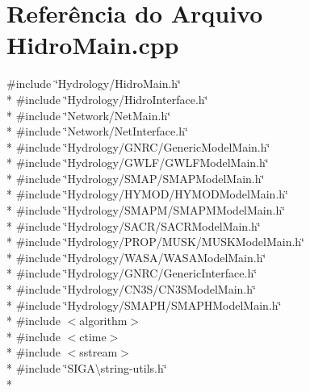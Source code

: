 \section{Referência do Arquivo Hidro\+Main.\+cpp}
\label{_hidro_main_8cpp}
{\ttfamily \#include \char`\"{}Hydrology/\+Hidro\+Main.\+h\char`\"{}}\\*
{\ttfamily \#include \char`\"{}Hydrology/\+Hidro\+Interface.\+h\char`\"{}}\\*
{\ttfamily \#include \char`\"{}Network/\+Net\+Main.\+h\char`\"{}}\\*
{\ttfamily \#include \char`\"{}Network/\+Net\+Interface.\+h\char`\"{}}\\*
{\ttfamily \#include \char`\"{}Hydrology/\+G\+N\+R\+C/\+Generic\+Model\+Main.\+h\char`\"{}}\\*
{\ttfamily \#include \char`\"{}Hydrology/\+G\+W\+L\+F/\+G\+W\+L\+F\+Model\+Main.\+h\char`\"{}}\\*
{\ttfamily \#include \char`\"{}Hydrology/\+S\+M\+A\+P/\+S\+M\+A\+P\+Model\+Main.\+h\char`\"{}}\\*
{\ttfamily \#include \char`\"{}Hydrology/\+H\+Y\+M\+O\+D/\+H\+Y\+M\+O\+D\+Model\+Main.\+h\char`\"{}}\\*
{\ttfamily \#include \char`\"{}Hydrology/\+S\+M\+A\+P\+M/\+S\+M\+A\+P\+M\+Model\+Main.\+h\char`\"{}}\\*
{\ttfamily \#include \char`\"{}Hydrology/\+S\+A\+C\+R/\+S\+A\+C\+R\+Model\+Main.\+h\char`\"{}}\\*
{\ttfamily \#include \char`\"{}Hydrology/\+P\+R\+O\+P/\+M\+U\+S\+K/\+M\+U\+S\+K\+Model\+Main.\+h\char`\"{}}\\*
{\ttfamily \#include \char`\"{}Hydrology/\+W\+A\+S\+A/\+W\+A\+S\+A\+Model\+Main.\+h\char`\"{}}\\*
{\ttfamily \#include \char`\"{}Hydrology/\+G\+N\+R\+C/\+Generic\+Interface.\+h\char`\"{}}\\*
{\ttfamily \#include \char`\"{}Hydrology/\+C\+N3\+S/\+C\+N3\+S\+Model\+Main.\+h\char`\"{}}\\*
{\ttfamily \#include \char`\"{}Hydrology/\+S\+M\+A\+P\+H/\+S\+M\+A\+P\+H\+Model\+Main.\+h\char`\"{}}\\*
{\ttfamily \#include $<$algorithm$>$}\\*
{\ttfamily \#include $<$ctime$>$}\\*
{\ttfamily \#include $<$sstream$>$}\\*
{\ttfamily \#include \char`\"{}S\+I\+G\+A\textbackslash{}string-\/utils.\+h\char`\"{}}\\*
